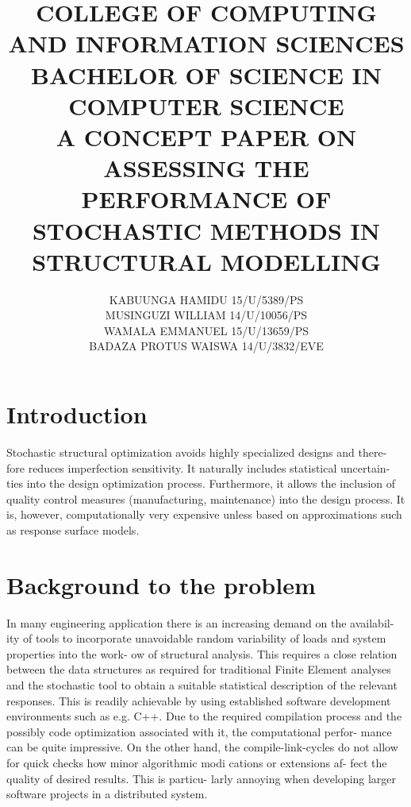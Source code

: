 \documentclass[12pt]{report}
\title{
{COLLEGE OF COMPUTING AND INFORMATION SCIENCES}\\
{\large BACHELOR OF SCIENCE IN COMPUTER SCIENCE}\\
{\Large \textbf{A CONCEPT PAPER ON ASSESSING THE PERFORMANCE OF STOCHASTIC METHODS IN STRUCTURAL MODELLING}}\\
}
\author{
{KABUUNGA HAMIDU 15/U/5389/PS}\\
{MUSINGUZI WILLIAM 14/U/10056/PS}\\
{WAMALA EMMANUEL 15/U/13659/PS}\\
{BADAZA PROTUS WAISWA 14/U/3832/EVE}
\textbf{}}
\begin{document}
\maketitle
\section{Introduction}
{Stochastic structural optimization avoids highly specialized designs and there-
	fore reduces imperfection sensitivity. It naturally includes statistical uncertain-
	ties into the design optimization process. Furthermore, it allows the inclusion of
	quality control measures (manufacturing, maintenance) into the design process.
	It is, however, computationally very expensive unless based on approximations
	such as response surface models.}
\section{Background to the problem}
{In many engineering application there is an increasing demand on the availabil-
	ity of tools to incorporate unavoidable random variability of loads and system
	properties into the work- ow of structural analysis. This requires a close relation
	between the data structures as required for traditional Finite Element analyses
	and the stochastic tool to obtain a suitable statistical description of the relevant
	responses. This is readily achievable by using established software development
	environments such as e.g. C++. Due to the required compilation process and
	the possibly code optimization associated with it, the computational perfor-
	mance can be quite impressive. On the other hand, the compile-link-cycles do
	not allow for quick checks how minor algorithmic modi
	cations or extensions af- fect the quality of desired results. This is particu-
	larly annoying when developing larger software projects in a distributed system.}
\

\begin{abstract}
\end{abstract}
\end{document}
